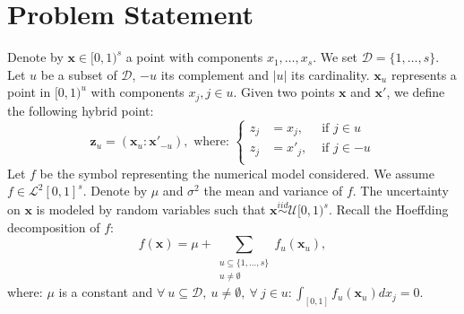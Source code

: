 \documentclass[]{elsarticle}
\theoremstyle{definition}
\newcommand{\bvec}[1]{\boldsymbol{#1}}
\newcommand{\vx}{\bvec{x}}
\newcommand{\vz}{\bvec{z}}
\begin{document}
\begin{frontmatter}

\title{}

\author{Cl\'ementine Prieur, Elise Arnaud, Herv\'{e} Monod, Laurent Gilquin, Fred J. Hickernell, Llu\'{i}s Antoni Jim\'{e}nez Rugama}
\address{U. Josef Fourier, Illinois Institute of Technology}
\begin{abstract}
\end{abstract}

\end{frontmatter}

\section{Problem Statement}
Denote by $\vx \in [0,1)^s$ a point with components $x_1,\dots,x_s$. We set $\mathcal{D}=\{1,\dots,s\}$. Let $u$ be a subset of $\mathcal{D}$, $-u$ its complement and $|u|$ its cardinality. $\vx_u$ represents a point in $[0,1)^u$ with components $x_j, j \in u$. Given two points $\vx$ and $\vx'$, we define the following hybrid point: 
\[\vz_u=(\vx_u:{\vx'}_{-u}), \text{ where: } \left\{
      \begin{aligned}
        z_j &= x_j, & \text{ if } j \in u\\
        z_j &= {x'}_j, & \text{ if } j \in -u\\
      \end{aligned}
    \right.  \]
Let $f$ be the symbol representing the numerical model considered. We assume $f \in \mathcal{L}^2[0,1]^s$. Denote by $\mu$ and $\sigma^2$ the mean and variance of $f$.
The uncertainty on $\vx$ is modeled by random variables such that $\vx \stackrel{iid}{\sim} \mathcal{U}[0,1)^s$. Recall the Hoeffding decomposition of $f$:
\begin{equation}
f(\vx)=\mu+\sum_{\substack{u \subseteq \{1,\dots,s\} \\ u \neq \emptyset}} f_u(\vx_u),
\label{anova}
\end{equation}
where: $\mu$ is a constant and $\forall \ u \subseteq \mathcal{D}, \ u \neq \emptyset, \ \forall \ j \in u: \int_{[0,1]} f_u(\vx_u) d{x_j}=0$.
\end{document}
